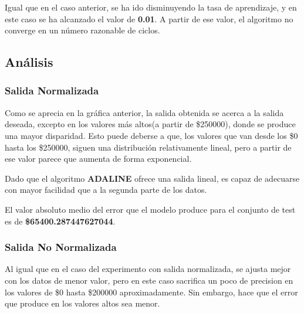 \documentclass{uc3mpracticas}
\begin{document}
      Igual que en el caso anterior, se ha ido disminuyendo la tasa de aprendizaje, y en este caso se ha alcanzado el valor de \textbf{0.01}. A partir de ese valor, el algoritmo no converge en un número razonable de ciclos.



    \subsection{Análisis}

    \subsubsection*{Salida Normalizada}


      Como se aprecia en la gráfica anterior, la salida obtenida se acerca a la salida deseada, excepto en los valores más altos(a partir de \$250000), donde se produce una mayor disparidad. Esto puede deberse a que, los valores que van desde los \$0 hasta los \$250000, siguen una distribución relativamente lineal, pero a partir de ese valor parece que aumenta de forma exponencial.

      \vspace{3mm}

      Dado que el algoritmo \textbf{ADALINE} ofrece una salida lineal, es capaz de adecuarse con mayor facilidad que a la segunda parte de los datos.

      \vspace{2mm}

      El valor absoluto medio del error que el modelo produce para el conjunto de test es de \textbf{\$65400.287447627044}.


    \subsubsection*{Salida No Normalizada}


      Al igual que en el caso del experimento con salida normalizada, se ajusta mejor con los datos de menor valor, pero en este caso sacrifica un poco de precision en los valores de \$0 hasta \$200000 aproximadamente. Sin embargo, hace que el error que produce en los valores altos sea menor.

      \vspace{2mm}
\end{document}
